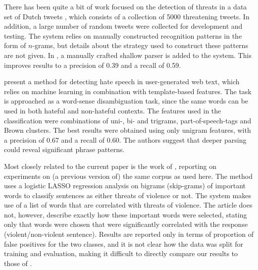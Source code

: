 \documentclass[11pt,letterpaper]{article}
\newcommand{\tovs}{threats of violence}
\begin{document}
There has been quite a bit of work focused on the detection of threats in a data set of Dutch tweets \cite{nellngram2013,nellshallow2013}, which consists of a collection of 5000 threatening tweets. %
In addition, a large number of random tweets were collected for development and testing. %
The system relies on manually constructed recognition patterns in the form of $n$-grams, 
but details about the strategy used to construct these patterns are not given. %
In , a manually crafted shallow parser is added to the system. This improves results to a precision of 0.39 and a recall of 0.59.

 present a method for detecting hate speech in user-generated web text, which relies on machine learning in combination with template-based features. The task is approached as a word-sense disambiguation task, since the same words can be used in both hateful and non-hateful contexts. The features used in the classification were combinations of uni-, bi- and trigrams, part-of-speech-tags and Brown clusters.  The best results were obtained using only unigram features, with a precision of 0.67 and a recall of 0.60. %
The authors suggest that deeper parsing could reveal significant phrase patterns.

Most closely related to the current paper is the work of , reporting on experiments on (a previous version of) the same corpus as used here. The method uses a logistic LASSO regression analysis on bigrams (skip-grams) of important words to classify sentences as either \tovs{} or not.  The system makes use of a list of words that are correlated with threats of violence. The article does not, however, describe exactly how these important words were selected, stating only that words were chosen that were significantly correlated with the response (violent/non-violent sentence). Results are reported only in terms of proportion of false positives for the two classes, and it is not clear how the data was split for training and evaluation, making it difficult to directly compare our results to those of .
\end{document}
